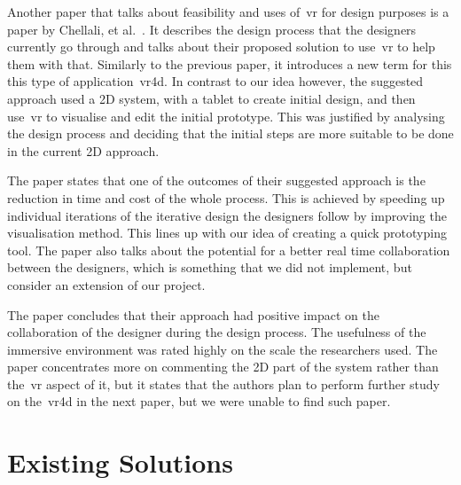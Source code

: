     Another paper that talks about feasibility and uses of~\acrshort{vr} for design purposes is a paper by Chellali, et al.~\cite{chellali2013}. It describes the design process that the designers currently go through and talks about their proposed solution to use~\acrshort{vr} to help them with that. Similarly to the previous paper, it introduces a new term for this this type of application~\acrfull{vr4d}. In contrast to our idea however, the suggested approach used a 2D system, with a tablet to create initial design, and then use~\acrshort{vr} to visualise and edit the initial prototype. This was justified by analysing the design process and deciding that the initial steps are more suitable to be done in the current 2D approach. 
    
    The paper states that one of the outcomes of their suggested approach is the reduction in time and cost of the whole process. This is achieved by speeding up individual iterations of the iterative design the designers follow by improving the visualisation method. This lines up with our idea of creating a quick prototyping tool. The paper also talks about the potential for a better real time collaboration between the designers, which is something that we did not implement, but consider an extension of our project.
    
    
    The paper concludes that their approach had positive impact on the collaboration of the designer during the design process. The usefulness of the immersive environment was rated highly on the scale the researchers used. The paper concentrates more on commenting the 2D part of the system rather than the~\acrshort{vr} aspect of it, but it states that the authors plan to perform further study on the~\acrshort{vr4d} in the next paper, but we were unable to find such paper.
    
\section{Existing Solutions}
\label{sec:existing_solutions}